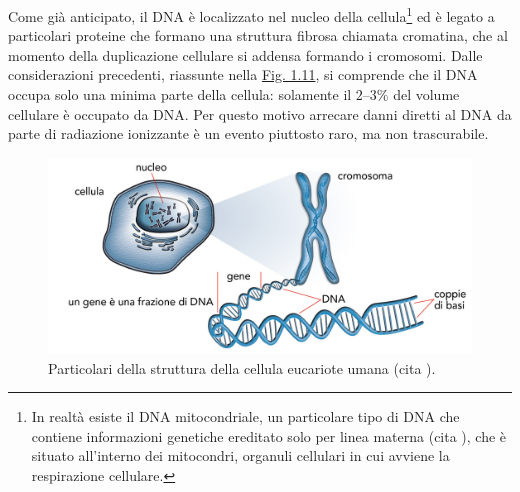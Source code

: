 \documentclass[12pt,a4paper,twoside]{report}
\begin{document}
	Come già anticipato, il DNA è localizzato nel nucleo della cellula\footnote{In realtà esiste il DNA mitocondriale, un particolare tipo di DNA che contiene informazioni genetiche ereditato solo per linea materna (cita
	), che è situato all'interno dei mitocondri, organuli cellulari in cui avviene la respirazione cellulare.} ed è legato a particolari proteine che formano una struttura fibrosa chiamata cromatina, che al momento della duplicazione cellulare si addensa formando i cromosomi. Dalle considerazioni precedenti, riassunte nella \hyperref[fig:cell]{Fig. 1.11}, si comprende che il DNA occupa solo una minima parte della cellula: solamente il $2$--$3\%$ del volume cellulare è occupato da DNA. Per questo motivo arrecare danni diretti al DNA da parte di radiazione ionizzante è un evento piuttosto raro, ma non trascurabile.
	\begin{figure}[H]
		\centering
		\includegraphics[width=0.9\linewidth]{cell.jpg}
		\caption{Particolari della struttura della cellula eucariote umana (cita
			).}
		\label{fig:cell}
	\end{figure}
	
\end{document}
